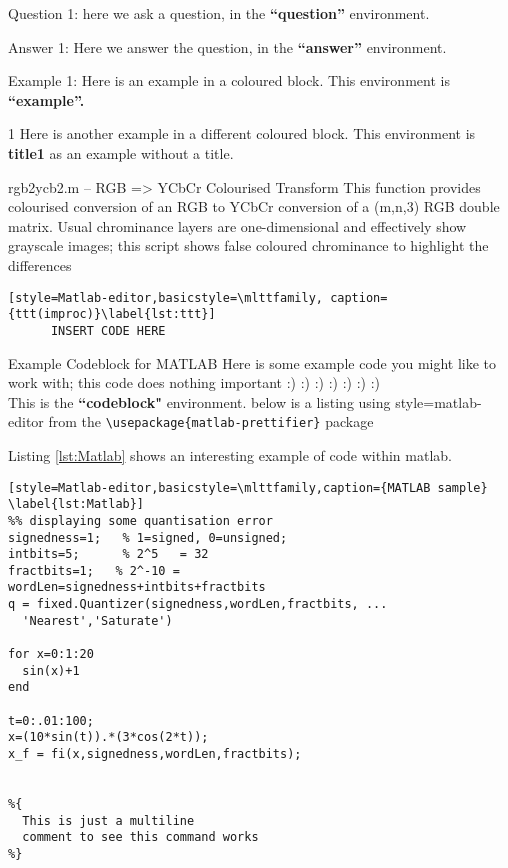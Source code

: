 \begin{question}{Question 1:}
  here we ask a question, in the \textbf{``question''} environment.
\end{question}

\begin{answer}{Answer 1:}
Here we answer the question, in the \textbf{``answer''} environment.
\end{answer}

\begin{example}{Example 1:}
Here is an example in a coloured block. This environment is \textbf{``example''.}
\end{example}

\begin{title1}{1}
Here is another example in a different coloured block. This environment is \textbf{title1} as an example without a title.
\end{title1}


\begin{codeblock}{rgb2ycb2.m -- RGB => YCbCr Colourised Transform}
  This function provides colourised conversion of an RGB to YCbCr conversion of a (m,n,3) RGB double matrix.
  Usual chrominance layers are one-dimensional and effectively show grayscale images; this script shows  false coloured chrominance to highlight the differences
      
  \begin{lstlisting}[style=Matlab-editor,basicstyle=\mlttfamily, caption={ttt(improc)}\label{lst:ttt}]
      INSERT CODE HERE

  \end{lstlisting}
\end{codeblock}

\begin{codeblock}{Example Codeblock for MATLAB}
Here is some example code you might like to work with; this code does nothing important :) :) :) :) :) :) :)\\
This is the \textbf{``codeblock"} environment. below is a listing using style=matlab-editor from the \verb|\usepackage{matlab-prettifier}| package

Listing \ref{lst:Matlab} shows an interesting example of code within matlab.
\begin{lstlisting}[style=Matlab-editor,basicstyle=\mlttfamily,caption={MATLAB sample} \label{lst:Matlab}]
%% displaying some quantisation error
signedness=1;   % 1=signed, 0=unsigned;
intbits=5;      % 2^5   = 32
fractbits=1;   % 2^-10 =
wordLen=signedness+intbits+fractbits
q = fixed.Quantizer(signedness,wordLen,fractbits, ...
  'Nearest','Saturate')

for x=0:1:20
  sin(x)+1
end

t=0:.01:100;
x=(10*sin(t)).*(3*cos(2*t));
x_f = fi(x,signedness,wordLen,fractbits);


%{
  This is just a multiline
  comment to see this command works
%}
\end{lstlisting}
\end{codeblock}



